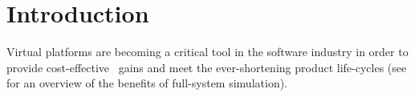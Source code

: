 
\chapter{Introduction}
\label{cha:introduction}

Virtual platforms are becoming a critical tool in the software industry in order to provide cost-effective \termttm\ gains and meet the ever-shortening product life-cycles (see  for an overview of the benefits of full-system simulation).
